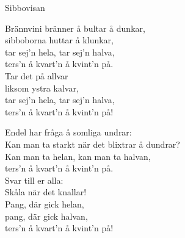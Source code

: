 \begin{song}{Sibbovisan}

    
    	
	Brännvini bränner å bultar å dunkar,\\
	sibboborna huttar å klunkar,\\
	tar sej'n hela, tar sej'n halva,\\
	ters'n å kvart'n å kvint'n på.\\
	Tar det på allvar\\
	liksom ystra kalvar,\\
	tar sej'n hela, tar sej'n halva,\\
	ters'n å kvart'n å kvint'n på!
	
	Endel har fråga å somliga undrar:\\
	Kan man ta starkt när det blixtrar å dundrar?\\
	Kan man ta helan, kan man ta halvan,\\
	ters'n å kvart'n å kvint'n på.\\
	Svar till er alla:\\
	Skåla när det knallar!\\
	Pang, där gick helan,\\
	pang, där gick halvan,\\
	ters'n å kvart'n å kvint'n på!
	
\end{song}
